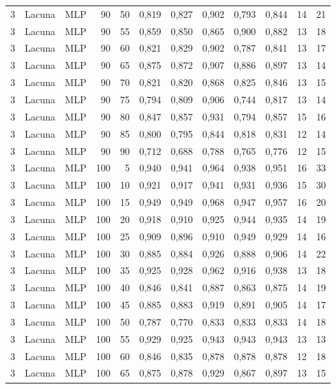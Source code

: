 \begin{longtable}{@{}rllrrrrrrrrr@{}}
3 & Lacuna & MLP & 90 & 50 & 0,819 & 0,827 & 0,902 & 0,793 & 0,844 & 14 & 21 \\
3 & Lacuna & MLP & 90 & 55 & 0,859 & 0,850 & 0,865 & 0,900 & 0,882 & 13 & 18 \\
3 & Lacuna & MLP & 90 & 60 & 0,821 & 0,829 & 0,902 & 0,787 & 0,841 & 13 & 17 \\
3 & Lacuna & MLP & 90 & 65 & 0,875 & 0,872 & 0,907 & 0,886 & 0,897 & 13 & 14 \\
3 & Lacuna & MLP & 90 & 70 & 0,821 & 0,820 & 0,868 & 0,825 & 0,846 & 13 & 15 \\
3 & Lacuna & MLP & 90 & 75 & 0,794 & 0,809 & 0,906 & 0,744 & 0,817 & 13 & 14 \\
3 & Lacuna & MLP & 90 & 80 & 0,847 & 0,857 & 0,931 & 0,794 & 0,857 & 15 & 16 \\
3 & Lacuna & MLP & 90 & 85 & 0,800 & 0,795 & 0,844 & 0,818 & 0,831 & 12 & 14 \\
3 & Lacuna & MLP & 90 & 90 & 0,712 & 0,688 & 0,788 & 0,765 & 0,776 & 12 & 15 \\
3 & Lacuna & MLP & 100 & 5 & 0,940 & 0,941 & 0,964 & 0,938 & 0,951 & 16 & 33 \\
3 & Lacuna & MLP & 100 & 10 & 0,921 & 0,917 & 0,941 & 0,931 & 0,936 & 15 & 30 \\
3 & Lacuna & MLP & 100 & 15 & 0,949 & 0,949 & 0,968 & 0,947 & 0,957 & 16 & 20 \\
3 & Lacuna & MLP & 100 & 20 & 0,918 & 0,910 & 0,925 & 0,944 & 0,935 & 14 & 19 \\
3 & Lacuna & MLP & 100 & 25 & 0,909 & 0,896 & 0,910 & 0,949 & 0,929 & 14 & 16 \\
3 & Lacuna & MLP & 100 & 30 & 0,885 & 0,884 & 0,926 & 0,888 & 0,906 & 14 & 22 \\
3 & Lacuna & MLP & 100 & 35 & 0,925 & 0,928 & 0,962 & 0,916 & 0,938 & 13 & 18 \\
3 & Lacuna & MLP & 100 & 40 & 0,846 & 0,841 & 0,887 & 0,863 & 0,875 & 14 & 19 \\
3 & Lacuna & MLP & 100 & 45 & 0,885 & 0,883 & 0,919 & 0,891 & 0,905 & 14 & 17 \\
3 & Lacuna & MLP & 100 & 50 & 0,787 & 0,770 & 0,833 & 0,833 & 0,833 & 14 & 18 \\
3 & Lacuna & MLP & 100 & 55 & 0,929 & 0,925 & 0,943 & 0,943 & 0,943 & 13 & 13 \\
3 & Lacuna & MLP & 100 & 60 & 0,846 & 0,835 & 0,878 & 0,878 & 0,878 & 12 & 18 \\
3 & Lacuna & MLP & 100 & 65 & 0,875 & 0,878 & 0,929 & 0,867 & 0,897 & 13 & 15 \\

\end{longtable}
